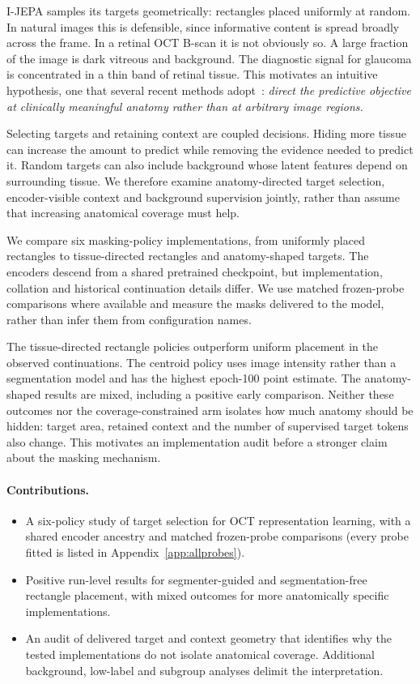 \documentclass{article}
\begin{document}
I-JEPA samples its targets geometrically: rectangles placed uniformly at random.
In natural images this is defensible, since informative content is spread
broadly across the frame. In a retinal OCT B-scan it is not obviously so. A
large fraction of the image is dark vitreous and background. The diagnostic
signal for glaucoma is concentrated in a thin band of retinal tissue. This
motivates an intuitive hypothesis, one that several recent methods
adopt~\citep{li2022semmae,li2024anatomask,wang2025maskwhatmatters,shi2022adios}:
\emph{direct the predictive objective at clinically meaningful anatomy rather
than at arbitrary image regions.}

Selecting targets and retaining context are coupled decisions. Hiding more
tissue can increase the amount to predict while removing the evidence needed
to predict it. Random targets can also include background whose latent features
depend on surrounding tissue. We therefore examine anatomy-directed target
selection, encoder-visible context and background supervision jointly, rather
than assume that increasing anatomical coverage must help.

We compare six masking-policy implementations, from uniformly placed rectangles
to tissue-directed rectangles and anatomy-shaped targets. The encoders descend
from a shared pretrained checkpoint, but implementation, collation and historical
continuation details differ. We use matched frozen-probe comparisons where
available and measure the masks delivered to the model, rather than infer them
from configuration names.

The tissue-directed rectangle policies outperform uniform placement in the
observed continuations. The centroid policy uses image intensity rather than
a segmentation model and has the highest epoch-100 point estimate.
The anatomy-shaped results are mixed, including a positive early comparison.
Neither these outcomes nor the coverage-constrained arm isolates how much
anatomy should be hidden: target area, retained context and the number of
supervised target tokens also change. This motivates an implementation audit
before a stronger claim about the masking mechanism.

\paragraph{Contributions.}
\begin{itemize}
\setlength{\itemsep}{0pt}\setlength{\parskip}{0pt}
\item A six-policy study of target selection for OCT representation learning,
      with a shared encoder ancestry and matched frozen-probe comparisons (every probe
      fitted is listed in Appendix~\ref{app:allprobes}).
\item Positive run-level results for segmenter-guided and segmentation-free
      rectangle placement, with mixed outcomes for more anatomically specific
      implementations.
\item An audit of delivered target and context geometry that identifies why
      the tested implementations do not isolate anatomical coverage. Additional
      background, low-label and subgroup analyses delimit the interpretation.
\end{itemize}
\end{document}
